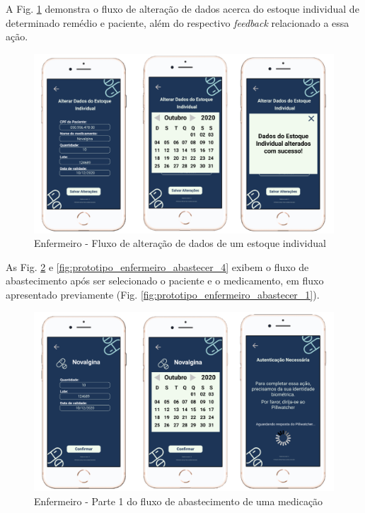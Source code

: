 A Fig. \ref{fig:prototipo_enfermeiro_abastecer_2} demonstra o fluxo de alteração de dados acerca do estoque individual de determinado remédio e paciente, além do respectivo \textit{feedback} relacionado a essa ação.

\begin{figure}[H]
    \centering
    \includegraphics[width=13cm]{figuras/software/Atual_prototipo/Enfermeiro_abastecer_2.png}
    \caption{Enfermeiro - Fluxo de alteração de dados de um estoque individual}
    \label{fig:prototipo_enfermeiro_abastecer_2}
\end{figure}

As Fig. \ref{fig:prototipo_enfermeiro_abastecer_3} e \ref{fig:prototipo_enfermeiro_abastecer_4} exibem o fluxo de abastecimento após ser selecionado o paciente e o medicamento, em fluxo apresentado previamente (Fig. \ref{fig:prototipo_enfermeiro_abastecer_1}).

\begin{figure}[H]
    \centering
    \includegraphics[width=13cm]{figuras/software/Atual_prototipo/Enfermeiro_abastecer_3.png}
    \caption{Enfermeiro - Parte 1 do fluxo de abastecimento de uma medicação}
    \label{fig:prototipo_enfermeiro_abastecer_3}
\end{figure}

